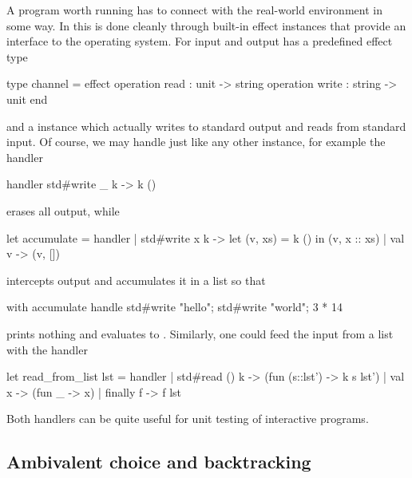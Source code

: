 A program worth running has to connect with the real-world environment in some way. In
\eff this is done cleanly through built-in effect instances that provide an interface to
the operating system. For input and output \eff has a predefined effect type
%
\begin{source}
type channel = effect
  operation read : unit -> string
  operation write : string -> unit
end
\end{source}
%
and a  instance  which actually writes to standard output and reads from standard input. Of course, we may handle  just like any other instance, for example the handler
%
\begin{source}
handler std#write _ k -> k ()
\end{source}
%
erases all output, while
%
\begin{source}
let accumulate = handler
  | std#write x k -> let (v, xs) = k () in (v, x :: xs)
  | val v -> (v, [])
\end{source}
%
intercepts output and accumulates it in a list so that
%
\begin{source}
with accumulate handle
  std#write "hello"; std#write "world"; 3 * 14
\end{source}
%
prints nothing and evaluates to . Similarly, one could
feed the input from a list with the handler
%
\begin{source}
let read_from_list lst = handler
  | std#read () k -> (fun (s::lst') -> k s lst')
  | val x -> (fun _ -> x)
  | finally f -> f lst
\end{source}
%
Both handlers can be quite useful for unit testing of interactive programs.


\subsection{Ambivalent choice and backtracking}
\label{sec:amb-backtrack}

